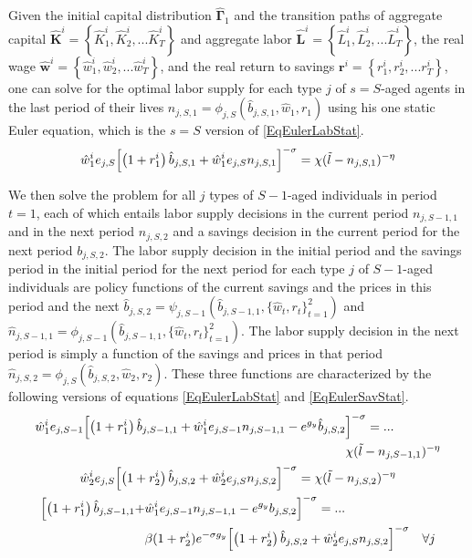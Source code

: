 \documentclass[letterpaper,12pt]{article}
\theoremstyle{definition}
\begin{document}
  Given the initial capital distribution $\bm{\hat{\Gamma}}_1$ and the transition paths of aggregate capital $\bm{\hat{K}}^i = \left\{\hat{K}_1^i,\hat{K}_2^i,...\hat{K}_T^i\right\}$ and aggregate labor $\bm{\hat{L}}^i = \left\{\hat{L}_1^i,\hat{L}_2^i,...\hat{L}_T^i\right\}$, the real wage $\bm{\hat{w}}^i = \left\{\hat{w}_1^i,\hat{w}_2^i,...\hat{w}_T^i\right\}$, and the real return to savings $\bm{r}^i = \left\{r_1^i,r_2^i,...r_T^i\right\}$, one can solve for the optimal labor supply for each type $j$ of $s=S$-aged agents in the last period of their lives $n_{j,S,1}=\phi_{j,S}(\hat{b}_{j,S,1},\hat{w}_1,r_1)$ using his one static Euler equation, which is the $s=S$ version of \eqref{EqEulerLabStat}.
  \begin{equation}\label{EqEulerSlabt1}
    \hat{w}^i_1 e_{j,S}\Bigl[\left(1+r^i_1\right)\hat{b}_{j,S,1} + \hat{w}^i_1 e_{j,S}n_{j,S,1}\Bigr]^{-\sigma} = \chi(\tilde{l} - n_{j,S,1})^{-\eta}
  \end{equation}

  We then solve the problem for all $j$ types of $S-1$-aged individuals in period $t=1$, each of which entails labor supply decisions in the current period $n_{j,S-1,1}$ and in the next period $n_{j,S,2}$ and a savings decision in the current period for the next period $b_{j,S,2}$. The labor supply decision in the initial period and the savings period in the initial period for the next period for each type $j$ of $S-1$-aged individuals are policy functions of the current savings and the prices in this period and the next $\hat{b}_{j,S,2} = \psi_{j,S-1}(\hat{b}_{j,S-1,1},\{\hat{w}_t,r_t\}_{t=1}^2)$ and $\hat{n}_{j,S-1,1} = \phi_{j,S-1}(\hat{b}_{j,S-1,1},\{\hat{w}_t,r_t\}_{t=1}^2)$. The labor supply decision in the next period is simply a function of the savings and prices in that period $\hat{n}_{j,S,2} = \phi_{j,S}(\hat{b}_{j,S,2},\hat{w}_2,r_2)$. These three functions are characterized by the following versions of equations \eqref{EqEulerLabStat} and \eqref{EqEulerSavStat}.
  \begin{gather}
    \begin{split}
      \hat{w}^i_1 e_{j,S-1}\Bigl[\left(1+r^i_1\right)\hat{b}_{j,S-1,1} + \hat{w}^i_1 e_{j,S-1}n_{j,S-1,1} - e^{g_y}\hat{b}_{j,S,2}&\Bigr]^{-\sigma} = ... \\
      &\chi(\tilde{l} - n_{j,S-1,1})^{-\eta}
    \end{split} \label{EqEulerSm1labt1} \\
    \hat{w}^i_2 e_{j,S}\Bigl[\left(1+r^i_2\right)\hat{b}_{j,S,2} + \hat{w}^i_2 e_{j,S}n_{j,S,2}\Bigr]^{-\sigma} = \chi(\tilde{l} - n_{j,S,2})^{-\eta} \label{EqEulerSlabt2} \\
    \begin{split}
      \Bigl[\left(1+r^i_1\right)\hat{b}_{j,S-1,1} + &\hat{w}^i_1 e_{j,S-1}n_{j,S-1,1} - e^{g_y}b_{j,S,2}\Bigr]^{-\sigma} = ... \\
      &\beta(1+r^i_2)e^{-\sigma g_y}\Bigl[\left(1+r^i_2\right)\hat{b}_{j,S,2} + \hat{w}^i_2 e_{j,S}n_{j,S,2}\Bigr]^{-\sigma} \quad\forall j
    \end{split}\label{EqEulerSm1savt1}
  \end{gather}
\end{document}
